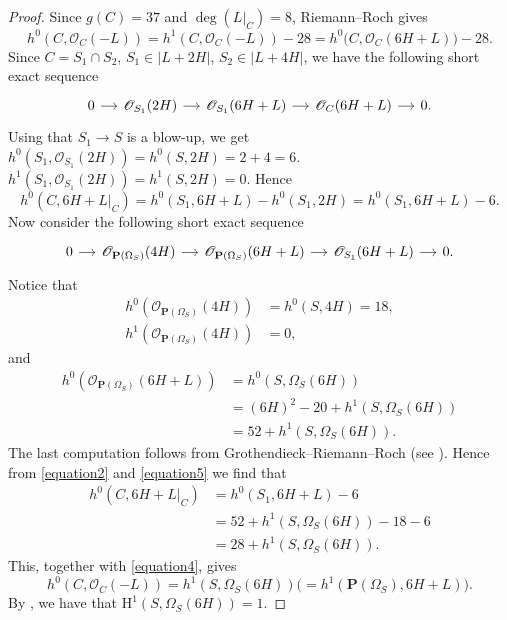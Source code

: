 \documentclass[a4paper,12pt,twoside,reqno]{amsart}
\numberwithin{equation}{section}
\theoremstyle{plain}
\theoremstyle{definition}
\newcommand{\PP}{\mathbf{P}}
\newcommand{\HH}{\mathrm{H}}
\newcommand{\OO}{\mathscr{O}}
\theoremstyle{plain}
\theoremstyle{definition}
\begin{document}
\begin{proof}
Since $g(C)=37$ and $\deg(L|_C)=8$, Riemann--Roch gives
\begin{equation}
\label{equation4}
h^0(C,\OO_C(-L))=h^1(C,\OO_C(-L))-28
 =h^0\bigl(C,\OO_C(6H+L)\bigr)-28.
\end{equation}
Since $C= S_1 \cap S_2$, $S_1 \in |L+2H|$,  $S_2 \in |L+4H|$, we have the following short exact sequence
\[
\begin{tikzcd}[column sep=small]
0 \arrow[r] & \OO_{S_1}(2H) \arrow[r]
& \OO_{S_1}(6H+L) \arrow[r]
& \OO_C(6H+L) \arrow[r] & 0.
\end{tikzcd}
\]
Using that $S_1 \rightarrow S $ is a blow-up, we get $h^0(S_1,\OO_{S_1}(2H))=h^0(S,2H)=2+4=6$.  $h^1(S_1,\OO_{S_1}(2H))=h^1(S,2H)=0$. Hence
\begin{equation}
\label{equation2}
h^0(C,6H+L|_C)=h^0(S_1,6H+L)-h^0(S_1,2H)=h^0(S_1,6H+L)-6.
\end{equation}
Now consider the following short exact sequence
\begin{equation}
\label{equation5}
\begin{tikzcd}[column sep=small]
0 \arrow[r] & \OO_{\PP(\Omega_S)}(4H) \arrow[r]
& \OO_{\PP(\Omega_S)}(6H+L) \arrow[r]
& \OO_{S_1}(6H+L) \arrow[r] & 0.
\end{tikzcd}
\end{equation}
Notice that
\begin{align*}
h^0(\OO_{\PP(\Omega_S)}(4H))&=h^0(S,4H)=18,\\
h^1(\OO_{\PP(\Omega_S)}(4H))&=0,
\end{align*}
and
\begin{align*}
h^0(\OO_{\PP(\Omega_S)}(6H+L))
   &=h^0(S,\Omega_S(6H))\\
   &=(6H)^2-20+h^1(S,\Omega_S(6H))\\
   &=52+h^1(S,\Omega_S(6H)).
\end{align*}
The last computation follows from Grothendieck--Riemann--Roch (see \cite[Theorem 3.1]{Totaro}). 
Hence from \eqref{equation2} and \eqref{equation5}  we find that
\begin{align*}
h^0(C,6H+L|_C)
   &=h^0(S_1,6H+L)-6\\
   &=52+h^1(S,\Omega_S(6H))-18-6\\
   &=28+h^1(S,\Omega_S(6H)).
\end{align*}
This, together with \eqref{equation4}, gives
\begin{equation*}
h^0(C,\OO_C(-L))=h^1(S,\Omega_S(6H))
 \bigl(=h^1(\PP(\Omega_S),6H+L)\bigr).
\end{equation*}
By \cite[Lemma 3.7]{DedieuSernesi}, we have that $\HH^1(S,\Omega_S(6H))=1$.
\end{proof}
\end{document}
